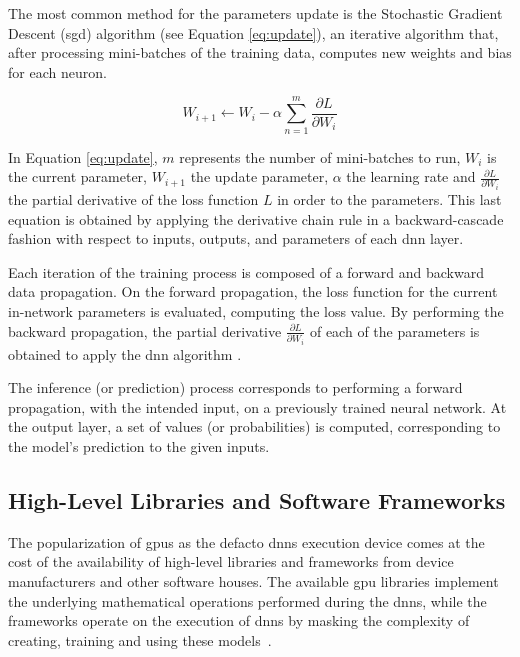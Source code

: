 The most common method for the parameters update is the Stochastic Gradient Descent (\acrshort{sgd}) algorithm (see Equation \ref{eq:update}), an iterative algorithm that, after processing mini-batches of the training data, computes new weights and bias for each neuron. 

\begin{equation}
    \label{eq:update}
    W_{i+1} \xleftarrow{} W_i - \alpha \sum_{n=1}^{m}\frac{\partial L}{\partial W_i}
\end{equation}

In Equation \ref{eq:update}, $m$ represents the number of mini-batches to run, $W_i$ is the current parameter, $W_{i+1}$ the update parameter, $\alpha$ the learning rate and $\frac{\partial L}{\partial W_i}$ the partial derivative of the loss function $L$ in order to the parameters. This last equation is obtained by applying the derivative chain rule in a backward-cascade fashion with respect to inputs, outputs, and parameters of each \acrshort{dnn} layer.

Each iteration of the training process is composed of a forward and backward data propagation. On the forward propagation, the loss function for the current in-network parameters is evaluated, computing the loss value. By performing the backward propagation, the partial derivative $\frac{\partial L}{\partial W_i}$ of each of the parameters is obtained to apply the \acrshort{dnn} algorithm . 

The inference (or prediction) process corresponds to performing a forward propagation, with the intended input, on a previously trained neural network. At the output layer, a set of values (or probabilities) is computed, corresponding to the model's prediction to the given inputs.

\subsection{High-Level Libraries and Software Frameworks}

The popularization of \acrshort{gpu}s as the defacto \acrshort{dnn}s execution device comes at the cost of the availability of high-level libraries and frameworks from device manufacturers and other software houses. The available \acrshort{gpu} libraries implement the underlying mathematical operations performed during the \acrshort{dnn}s, while the frameworks operate on the execution of \acrshort{dnn}s by masking the complexity of creating, training and using these models~\cite{jain_performance_2019}.

